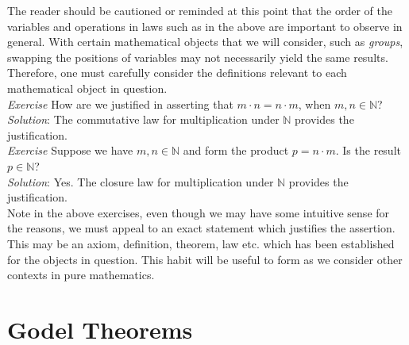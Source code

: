 The reader should be cautioned or reminded at this point that the order of the variables and operations in laws such as in the above are important to observe in general.  With certain mathematical objects that we will consider, such as \textit{groups}, swapping the positions of variables may not necessarily yield the same results.  Therefore, one must carefully consider the definitions relevant to each mathematical object in question.\\

\textit{Exercise}  How are we justified in asserting that $m \cdot n = n \cdot m$, when $m,n \in \mathbb{N}$?\\
\textit{Solution}:  The commutative law for multiplication under $\mathbb{N}$ provides the justification.\\ 

\textit{Exercise}  Suppose we have $m,n \in \mathbb{N}$ and form the product $p=n \cdot m$.  Is the result $p \in \mathbb{N}$?\\
\textit{Solution}:  Yes.  The closure law for multiplication under $\mathbb{N}$ provides the justification.\\

Note in the above exercises, even though we may have some intuitive sense for the reasons, we must appeal to an exact statement which justifies the assertion.  This may be an axiom, definition, theorem, law etc. which has been established for the objects in question.  This habit will be useful to form as we consider other contexts in pure mathematics.

\section{Godel Theorems}
